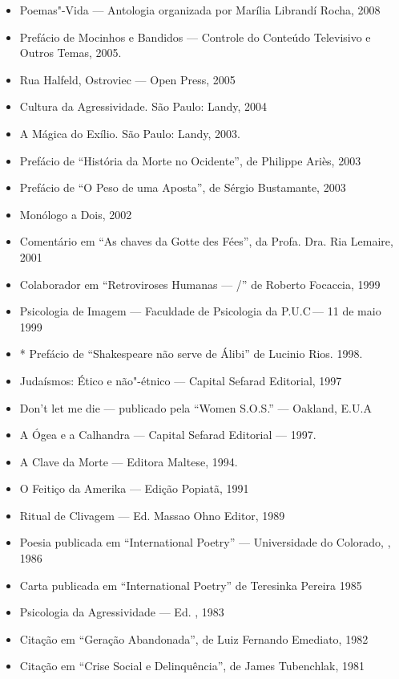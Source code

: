 \begin{itemize}
  Psicologia em Curta"-Metragem. São Paulo: Novo Conceito, 2008
\item
  Poemas"-Vida --- Antologia organizada por Marília Librandí Rocha, 2008
\item
  Prefácio de Mocinhos e Bandidos --- Controle do Conteúdo Televisivo e
  Outros Temas, 2005.
\item
  Rua Halfeld, Ostroviec --- Open Press, 2005
\item
  Cultura da Agressividade. São Paulo: Landy, 2004
\item
  A Mágica do Exílio. São Paulo: Landy, 2003.
\item
  Prefácio de ``História da Morte no Ocidente'', de Philippe Ariès, 2003
\item
  Prefácio de ``O Peso de uma Aposta'', de Sérgio Bustamante, 2003
\item
  Monólogo a Dois, 2002
\item
  Comentário em ``As chaves da Gotte des Fées'', da Profa. Dra. Ria
  Lemaire, 2001
\item
  Colaborador em ``Retroviroses Humanas --- /'' de Roberto
  Focaccia, 1999
\item
  Psicologia de Imagem --- Faculdade de Psicologia da P.U.C\,--- 11 de
  maio 1999
\item
  * Prefácio de ``Shakespeare não serve de Álibi'' de Lucinio Rios.
  1998.
\item
  Judaísmos: Ético e não"-étnico --- Capital Sefarad Editorial, 1997
\item
  Don't let me die --- publicado pela ``Women S.O.S.'' --- Oakland,
  E.U.A\,\item
  A Ógea e a Calhandra --- Capital Sefarad Editorial --- 1997.
\item
  A Clave da Morte --- Editora Maltese, 1994.
\item
  O Feitiço da Amerika --- Edição Popiatã, 1991
\item
  Ritual de Clivagem --- Ed. Massao Ohno Editor, 1989
\item
  Poesia publicada em ``International Poetry'' --- Universidade do
  Colorado, , 1986
\item
  Carta publicada em ``International Poetry'' de Teresinka Pereira 1985
\item
  Psicologia da Agressividade --- Ed. , 1983
\item
  Citação em ``Geração Abandonada'', de Luiz Fernando Emediato, 1982
\item
  Citação em ``Crise Social e Delinquência'', de James Tubenchlak, 1981

\end{itemize}
